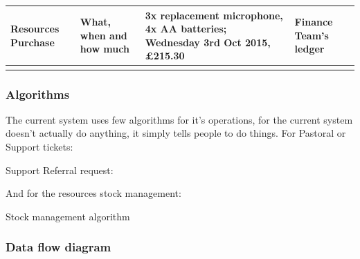 \begin{landscape}
\begin{table}
\begin{tabular}{llll}
    \multicolumn{1}{|l|}{Resources Purchase} & \multicolumn{1}{l|}{What, when and how much}  & \multicolumn{1}{l|}{3x replacement microphone, 4x AA batteries; Wednesday 3rd Oct 2015, £215.30}     & \multicolumn{1}{l|}{Finance Team's ledger}             \\ \hline
    \multicolumn{1}{|l|}{}                   & \multicolumn{1}{l|}{}                         & \multicolumn{1}{l|}{}                                                                                & \multicolumn{1}{l|}{}                                  \\ \hline

    \end{tabular}
    \end{table}
\end{landscape}


\subsubsection{Algorithms}
 The current system uses few algorithms for it's operations, for the current system doesn't actually do anything, it simply tells people to do things.
For Pastoral or Support tickets:
\begin{algorithm}[H]
	\caption{Support Referral request:}
	\begin{algorithmic}[1]
		\Repeat
	\end{algorithmic}
\end{algorithm}

And for the resources stock management:
\begin{algorithm}[H]
	\caption{Stock management algorithm}
	\begin{algorithmic}[1]
		\EndIf
	\end{algorithmic}
\end{algorithm}

\subsubsection{Data flow diagram}

